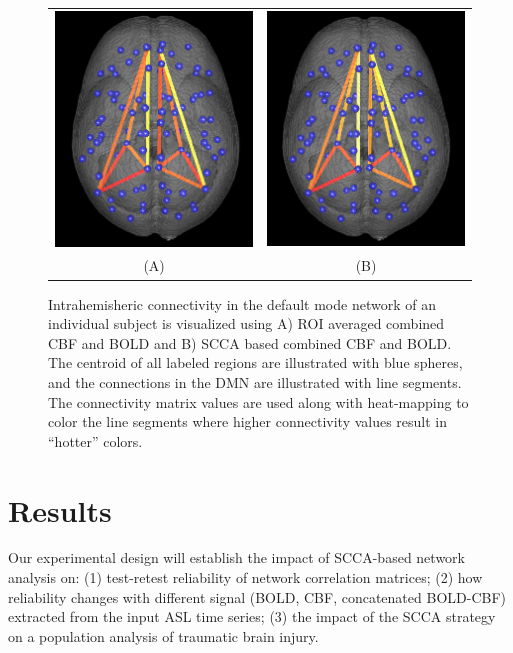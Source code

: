 \documentclass{llncs}
\begin{document}
\begin{figure}[tb]
\begin{center}
\begin{tabular}{ c c }
\includegraphics[width=0.25\linewidth]{roi.png} & \includegraphics[width=0.25\linewidth]{scca.png} \\
(A) & (B)
\end{tabular}
\caption{ Intrahemisheric connectivity in the default mode network of an individual subject is visualized using A) ROI averaged combined CBF and BOLD and B) SCCA based combined CBF and BOLD. The centroid of all labeled regions are illustrated with blue spheres, and the connections in the DMN are illustrated with line segments. The connectivity matrix values are used along with heat-mapping to color the line segments where higher connectivity values result in ``hotter'' colors. }
\label{fig:dmn}
\end{center}
\end{figure}


\section{Results}
Our experimental design will establish the impact of SCCA-based network analysis on: (1) test-retest reliability of network correlation matrices; (2) how reliability changes with different signal (BOLD, CBF, concatenated BOLD-CBF) extracted from the input ASL time series;  (3) the impact of the SCCA strategy on a population analysis of traumatic brain injury.  
\end{document}

